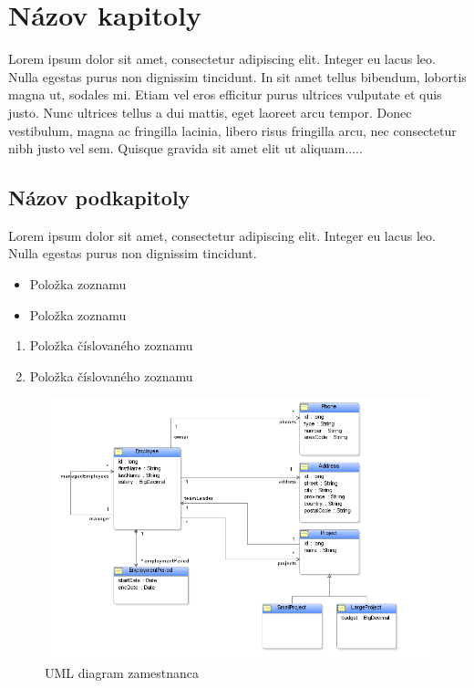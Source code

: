 \section{Názov kapitoly}
Lorem ipsum dolor sit amet, consectetur adipiscing elit. Integer eu lacus leo. Nulla egestas purus non dignissim tincidunt. In sit amet tellus bibendum, lobortis magna ut, sodales mi. Etiam vel eros efficitur purus ultrices vulputate et quis justo. Nunc ultrices tellus a dui mattis, eget laoreet arcu tempor. Donec vestibulum, magna ac fringilla lacinia, libero risus fringilla arcu, nec consectetur nibh justo vel sem. Quisque gravida sit amet elit ut aliquam.....

\subsection{Názov podkapitoly}
Lorem ipsum dolor sit amet, consectetur adipiscing elit. Integer eu lacus leo. Nulla egestas purus non dignissim tincidunt. 
\begin{itemize}
    \item Položka zoznamu
    \item Položka zoznamu
\end{itemize}
\hfill
\begin{enumerate}
    \item Položka číslovaného zoznamu
    \item Položka číslovaného zoznamu
\end{enumerate}

\begin{figure}[h]
    \includegraphics{examples/images/employee-model.png}
    \caption{UML diagram zamestnanca}
    \label{fig:example1}
\end{figure}

